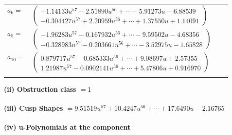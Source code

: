 \documentclass[1p]{elsarticle_modified}
\theoremstyle{definition}
\begin{document}
\begin{tabular}{m{7pt} m{180pt} m{7pt} m{180pt} }
\flushright $a_{6}=$&$\begin{pmatrix}-1.14133 u^{57}-2.51890 u^{56}+\cdots-5.91273 u-6.88539\\-0.304427 u^{57}+2.20959 u^{56}+\cdots+1.37550 u+1.14091\end{pmatrix}$ \\
\flushright $a_{5}=$&$\begin{pmatrix}-1.96283 u^{57}-0.167932 u^{56}+\cdots-9.59502 u-4.68356\\-0.328983 u^{57}-0.203661 u^{56}+\cdots-3.52975 u-1.65828\end{pmatrix}$ \\
\flushright $a_{10}=$&$\begin{pmatrix}0.879717 u^{57}-0.685333 u^{56}+\cdots+9.08697 u+2.57355\\1.21987 u^{57}-0.0902141 u^{56}+\cdots+5.47806 u+0.916970\end{pmatrix}$\\&\end{tabular}
\flushleft \textbf{(ii) Obstruction class $= 1$}\\~\\
\flushleft \textbf{(iii) Cusp Shapes $= 9.51519 u^{57}+10.4247 u^{56}+\cdots+17.6490 u-2.16765$}\\~\\
\newpage\renewcommand{\arraystretch}{1}
\flushleft \textbf{(iv) u-Polynomials at the component}\newline \\
\end{document}
